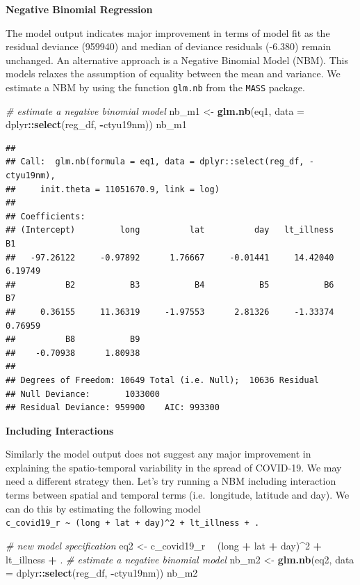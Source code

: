 \documentclass[
]{book}
\newenvironment{Shaded}{\begin{snugshade}}{\end{snugshade}}
\newcommand{\CommentTok}[1]{\textcolor[rgb]{0.56,0.35,0.01}{\textit{#1}}}
\newcommand{\DataTypeTok}[1]{\textcolor[rgb]{0.13,0.29,0.53}{#1}}
\newcommand{\DecValTok}[1]{\textcolor[rgb]{0.00,0.00,0.81}{#1}}
\newcommand{\KeywordTok}[1]{\textcolor[rgb]{0.13,0.29,0.53}{\textbf{#1}}}
\newcommand{\NormalTok}[1]{#1}
\newcommand{\OperatorTok}[1]{\textcolor[rgb]{0.81,0.36,0.00}{\textbf{#1}}}
\newcommand{\StringTok}[1]{\textcolor[rgb]{0.31,0.60,0.02}{#1}}
\begin{document}
\textbf{Negative Binomial Regression}

The model output indicates major improvement in terms of model fit as the residual deviance (959940) and median of deviance residuals (-6.380) remain unchanged. An alternative approach is a Negative Binomial Model (NBM). This models relaxes the assumption of equality between the mean and variance. We estimate a NBM by using the function \texttt{glm.nb} from the \texttt{MASS} package.

\begin{Shaded}
\begin{Highlighting}[]
\CommentTok{# estimate a negative binomial model}
\NormalTok{nb_m1 <-}\StringTok{ }\KeywordTok{glm.nb}\NormalTok{(eq1, }
       \DataTypeTok{data =}\NormalTok{ dplyr}\OperatorTok{::}\KeywordTok{select}\NormalTok{(reg_df, }\OperatorTok{-}\NormalTok{ctyu19nm))}
\NormalTok{nb_m1}
\end{Highlighting}
\end{Shaded}

\begin{verbatim}
## 
## Call:  glm.nb(formula = eq1, data = dplyr::select(reg_df, -ctyu19nm), 
##     init.theta = 11051670.9, link = log)
## 
## Coefficients:
## (Intercept)         long          lat          day   lt_illness           B1  
##   -97.26122     -0.97892      1.76667     -0.01441     14.42040      6.19749  
##          B2           B3           B4           B5           B6           B7  
##     0.36155     11.36319     -1.97553      2.81326     -1.33374      0.76959  
##          B8           B9  
##    -0.70938      1.80938  
## 
## Degrees of Freedom: 10649 Total (i.e. Null);  10636 Residual
## Null Deviance:       1033000 
## Residual Deviance: 959900    AIC: 993300
\end{verbatim}

\textbf{Including Interactions}

Similarly the model output does not suggest any major improvement in explaining the spatio-temporal variability in the spread of COVID-19. We may need a different strategy then. Let's try running a NBM including interaction terms between spatial and temporal terms (i.e.~longitude, latitude and day). We can do this by estimating the following model \texttt{c\_covid19\_r\ \textasciitilde{}\ (long\ +\ lat\ +\ day)\^{}2\ +\ lt\_illness\ +\ .}

\begin{Shaded}
\begin{Highlighting}[]
\CommentTok{# new model specification}
\NormalTok{eq2 <-}\StringTok{ }\NormalTok{c_covid19_r }\OperatorTok{~}\StringTok{ }\NormalTok{(long }\OperatorTok{+}\StringTok{ }\NormalTok{lat }\OperatorTok{+}\StringTok{ }\NormalTok{day)}\OperatorTok{^}\DecValTok{2} \OperatorTok{+}\StringTok{ }\NormalTok{lt_illness }\OperatorTok{+}\StringTok{ }\NormalTok{.}
\CommentTok{# estimate a negative binomial model}
\NormalTok{nb_m2 <-}\StringTok{ }\KeywordTok{glm.nb}\NormalTok{(eq2, }
       \DataTypeTok{data =}\NormalTok{ dplyr}\OperatorTok{::}\KeywordTok{select}\NormalTok{(reg_df, }\OperatorTok{-}\NormalTok{ctyu19nm))}
\NormalTok{nb_m2}
\end{Highlighting}
\end{Shaded}
\end{document}
